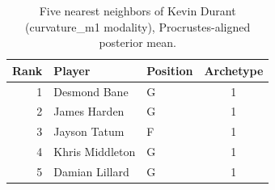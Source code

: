 \begin{table}[htbp]
  \centering\small
  \begin{tabular}{rllc}
    \toprule
    Rank & Player & Position & Archetype \\
    \midrule
    1 & Desmond Bane & G & 1 \\
    2 & James Harden & G & 1 \\
    3 & Jayson Tatum & F & 1 \\
    4 & Khris Middleton & G & 1 \\
    5 & Damian Lillard & G & 1 \\
    \bottomrule
  \end{tabular}
  \caption{Five nearest neighbors of Kevin Durant (curvature_m1 modality), Procrustes-aligned posterior mean.}
  \label{tab:Kevin_Durant_neighbors_curvature_m1}
\end{table}

